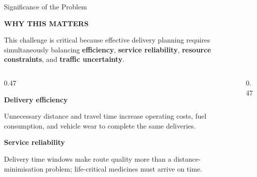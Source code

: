 \documentclass[aspectratio=169,10pt]{beamer}
\newcommand{\sectiontag}[1]{%
    {\scriptsize\bfseries\color{Accent}\MakeUppercase{#1}}\par\vspace{0.08cm}
}
\begin{document}

\begin{frame}{Significance of the Problem}

\sectiontag{Why This Matters}

\vspace{0.15cm}

\begin{center}
\footnotesize
This challenge is critical because effective delivery planning requires simultaneously balancing \textbf{efficiency}, \textbf{service reliability}, \textbf{resource constraints}, and \textbf{traffic uncertainty}.
\end{center}

\vspace{0.25cm}

\begin{columns}[T,totalwidth=\textwidth]


\begin{column}{0.47\textwidth}

\textbf{\normalsize\color{Primary}Delivery efficiency}

\vspace{0.04cm}

\footnotesize
Unnecessary distance and travel time increase operating costs,
fuel consumption, and vehicle wear to complete the same deliveries.

\vspace{0.25cm}

\textbf{\normalsize\color{Primary}Service reliability}

\vspace{0.04cm}

\footnotesize
Delivery time windows make route quality more than a distance-minimisation
problem; life-critical medicines must arrive on time.

\end{column}



\begin{column}{0.47\textwidth}


\end{column}
\end{columns}
\end{frame}
\end{document}
